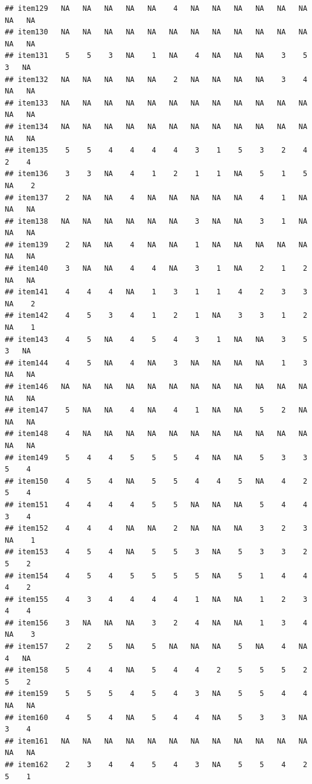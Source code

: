 \documentclass[
  man]{apa6}
\begin{document}
\begin{verbatim}
## item129   NA   NA   NA   NA   NA    4   NA   NA   NA   NA   NA   NA   NA   NA
## item130   NA   NA   NA   NA   NA   NA   NA   NA   NA   NA   NA   NA   NA   NA
## item131    5    5    3   NA    1   NA    4   NA   NA   NA    3    5    3   NA
## item132   NA   NA   NA   NA   NA    2   NA   NA   NA   NA    3    4   NA   NA
## item133   NA   NA   NA   NA   NA   NA   NA   NA   NA   NA   NA   NA   NA   NA
## item134   NA   NA   NA   NA   NA   NA   NA   NA   NA   NA   NA   NA   NA   NA
## item135    5    5    4    4    4    4    3    1    5    3    2    4    2    4
## item136    3    3   NA    4    1    2    1    1   NA    5    1    5   NA    2
## item137    2   NA   NA    4   NA   NA   NA   NA   NA    4    1   NA   NA   NA
## item138   NA   NA   NA   NA   NA   NA    3   NA   NA    3    1   NA   NA   NA
## item139    2   NA   NA    4   NA   NA    1   NA   NA   NA   NA   NA   NA   NA
## item140    3   NA   NA    4    4   NA    3    1   NA    2    1    2   NA   NA
## item141    4    4    4   NA    1    3    1    1    4    2    3    3   NA    2
## item142    4    5    3    4    1    2    1   NA    3    3    1    2   NA    1
## item143    4    5   NA    4    5    4    3    1   NA   NA    3    5    3   NA
## item144    4    5   NA    4   NA    3   NA   NA   NA   NA    1    3   NA   NA
## item146   NA   NA   NA   NA   NA   NA   NA   NA   NA   NA   NA   NA   NA   NA
## item147    5   NA   NA    4   NA    4    1   NA   NA    5    2   NA   NA   NA
## item148    4   NA   NA   NA   NA   NA   NA   NA   NA   NA   NA   NA   NA   NA
## item149    5    4    4    5    5    5    4   NA   NA    5    3    3    5    4
## item150    4    5    4   NA    5    5    4    4    5   NA    4    2    5    4
## item151    4    4    4    4    5    5   NA   NA   NA    5    4    4    3    4
## item152    4    4    4   NA   NA    2   NA   NA   NA    3    2    3   NA    1
## item153    4    5    4   NA    5    5    3   NA    5    3    3    2    5    2
## item154    4    5    4    5    5    5    5   NA    5    1    4    4    4    2
## item155    4    3    4    4    4    4    1   NA   NA    1    2    3    4    4
## item156    3   NA   NA   NA    3    2    4   NA   NA    1    3    4   NA    3
## item157    2    2    5   NA    5   NA   NA   NA    5   NA    4   NA    4   NA
## item158    5    4    4   NA    5    4    4    2    5    5    5    2    5    2
## item159    5    5    5    4    5    4    3   NA    5    5    4    4   NA   NA
## item160    4    5    4   NA    5    4    4   NA    5    3    3   NA    3    4
## item161   NA   NA   NA   NA   NA   NA   NA   NA   NA   NA   NA   NA   NA   NA
## item162    2    3    4    4    5    4    3   NA    5    5    4    2    5    1

\end{verbatim}
\end{document}
